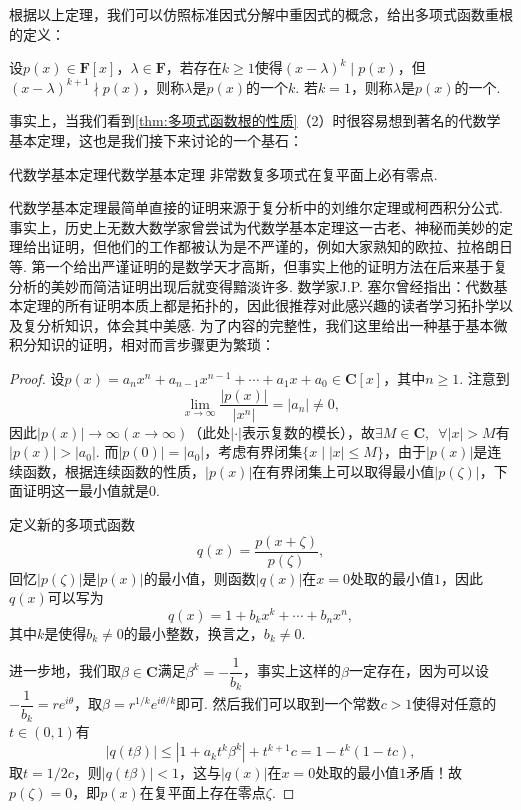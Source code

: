 根据以上定理，我们可以仿照标准因式分解中重因式的概念，给出多项式函数重根的定义：
\begin{definition}{}{}
    设$p(x)\in\mathbf{F}[x]$，$\lambda\in\mathbf{F}$，若存在$k\geqslant 1$使得$(x-\lambda)^k\mid p(x)$，但$(x-\lambda)^{k+1}\nmid p(x)$，则称$\lambda$是$p(x)$的一个$k$. 若$k=1$，则称$\lambda$是$p(x)$的一个.
\end{definition}

事实上，当我们看到\autoref{thm:多项式函数根的性质}（2）时很容易想到著名的代数学基本定理，这也是我们接下来讨论的一个基石：
\begin{theorem}{代数学基本定理}{代数学基本定理} 
    非常数复多项式在复平面上必有零点.
\end{theorem}

代数学基本定理最简单直接的证明来源于复分析中的刘维尔定理或柯西积分公式. 事实上，历史上无数大数学家曾尝试为代数学基本定理这一古老、神秘而美妙的定理给出证明，但他们的工作都被认为是不严谨的，例如大家熟知的欧拉、拉格朗日等. 第一个给出严谨证明的是数学天才高斯，但事实上他的证明方法在后来基于复分析的美妙而简洁证明出现后就变得黯淡许多. 数学家J.P. 塞尔曾经指出：代数基本定理的所有证明本质上都是拓扑的，因此很推荐对此感兴趣的读者学习拓扑学以及复分析知识，体会其中美感. 为了内容的完整性，我们这里给出一种基于基本微积分知识的证明，相对而言步骤更为繁琐：
\begin{proof}
    设$p(x)=a_nx^n+a_{n-1}x^{n-1}+\cdots+a_1x+a_0\in\mathbf{C}[x]$，其中$n\geqslant 1$. 注意到
    \[\lim_{x\to\infty}\dfrac{|p(x)|}{|x^n|}=|a_n|\neq 0,\]
    因此$|p(x)|\to\infty(x\to\infty)$（此处$|\cdot|$表示复数的模长），故$\exists M\in\mathbf{C},\enspace\forall |x|>M$有$|p(x)|>|a_0|$. 而$|p(0)|=|a_0|$，考虑有界闭集$\{x\mid |x|\leqslant M\}$，由于$|p(x)|$是连续函数，根据连续函数的性质，$|p(x)|$在有界闭集上可以取得最小值$|p(\zeta)|$，下面证明这一最小值就是$0$.

    定义新的多项式函数
    \[q(x)=\dfrac{p(x+\zeta)}{p(\zeta)},\]
    回忆$|p(\zeta)|$是$|p(x)|$的最小值，则函数$|q(x)|$在$x=0$处取的最小值$1$，因此$q(x)$可以写为
    \[q(x)=1+b_kx^k+\cdots+b_nx^n,\]
    其中$k$是使得$b_k\neq 0$的最小整数，换言之，$b_k\neq 0$.

    进一步地，我们取$\beta\in\mathbf{C}$满足$\beta^k=-\dfrac{1}{b_k}$，事实上这样的$\beta$一定存在，因为可以设$-\dfrac{1}{b_k}=re^{i\theta}$，取$\beta=r^{1/k}e^{i\theta/k}$即可. 然后我们可以取到一个常数$c>1$使得对任意的$t\in(0,1)$有
    \[|q(t\beta)|\leqslant |1+a_kt^k\beta^k|+t^{k+1}c=1-t^k(1-tc),\]
    取$t=1/2c$，则$|q(t\beta)|<1$，这与$|q(x)|$在$x=0$处取的最小值$1$矛盾！故$p(\zeta)=0$，即$p(x)$在复平面上存在零点$\zeta$.
\end{proof}

